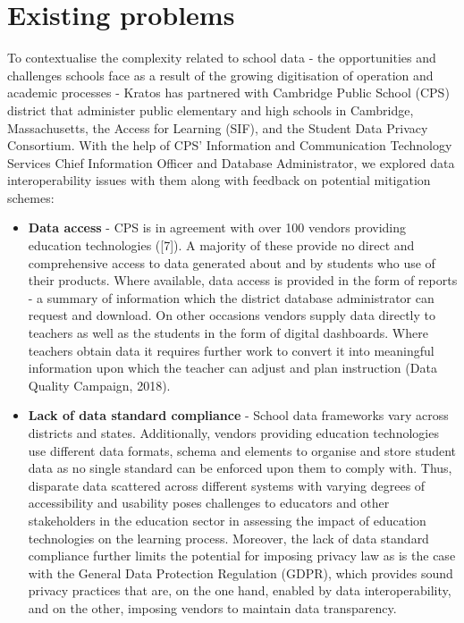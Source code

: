 \documentclass{article}
\begin{document}
\section{Existing problems}
To contextualise the complexity related to school data - the opportunities and challenges schools face as a result of the growing digitisation of operation and academic processes - Kratos has partnered with  Cambridge Public School (CPS) district that administer public elementary and high schools in Cambridge, Massachusetts, the Access for Learning (SIF), and the Student Data Privacy Consortium. With the help of CPS' Information and Communication Technology Services Chief Information Officer and Database Administrator, we explored data interoperability issues with them along with feedback on potential mitigation schemes:

\begin{itemize}
  \item \textbf{Data access} - CPS is in agreement with over 100 vendors providing education technologies ([7]). A majority of these provide no direct and comprehensive access to data generated about and by students who use of their products. Where available, data access is  provided in the form of reports - a summary of information which the district database administrator can request and download. On other occasions vendors supply data directly to teachers as well as the students in the form of digital dashboards. Where teachers obtain data it requires further work to convert it into meaningful information upon which the teacher can adjust and plan instruction (Data Quality Campaign, 2018).
  
  \item \textbf{Lack of data standard compliance} - School data frameworks vary across districts and states. Additionally, vendors providing education technologies use different data formats, schema and elements to organise and store student data as no single standard can be enforced upon them to comply with. Thus, disparate data scattered across different systems with varying degrees of accessibility and usability poses challenges to educators and other stakeholders in the education sector in assessing the impact of education technologies on the learning process. Moreover, the lack of data standard compliance further limits the potential for imposing privacy law as is the case with the General Data Protection Regulation (GDPR), which provides sound privacy practices that are, on the one hand, enabled by data interoperability, and on the other, imposing vendors to maintain data transparency.
  

\end{itemize}
\end{document}
